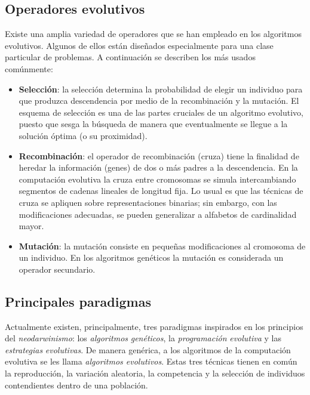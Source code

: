   \subsection{Operadores evolutivos}
  
  Existe una amplia variedad de operadores que se han empleado en los algoritmos evolutivos. Algunos de ellos est\'an 
  dise\~nados especialmente para una clase particular de problemas. A continuaci\'on se describen los m\'as usados com\'unmente:
  
  \begin{itemize}
   \item \textbf{Selecci\'on}: la selecci\'on determina la probabilidad de elegir un individuo para que produzca descendencia por medio 
   de la recombinaci\'on y la mutaci\'on. El esquema de selecci\'on es una de las partes cruciales de un algoritmo evolutivo, puesto 
   que sesga la b\'usqueda de manera que eventualmente se llegue a la soluci\'on \'optima (o su proximidad).
   \item \textbf{Recombinaci\'on}: el operador de recombinaci\'on (cruza) tiene la finalidad de heredar la informaci\'on (genes) 
   de dos o m\'as padres a la descendencia. En la computaci\'on evolutiva la cruza entre cromosomas se simula intercambiando segmentos 
   de cadenas lineales de longitud fija. Lo usual es que las t\'ecnicas de cruza se apliquen sobre representaciones binarias; sin embargo, 
   con las modificaciones adecuadas, se pueden generalizar a alfabetos de cardinalidad mayor.
   \item \textbf{Mutaci\'on}: la mutaci\'on consiste en peque\~nas modificaciones al cromosoma de un individuo. En los 
   algoritmos gen\'eticos la mutaci\'on es considerada un operador secundario.
  \end{itemize}
  
  \subsection{Principales paradigmas}
  
  Actualmente existen, principalmente, tres paradigmas inspirados en los principios del \textit{neodarwinismo}: los \textit{algoritmos}
  \textit{gen\'eticos}, la \textit{programaci\'on} \textit{evolutiva} y las \textit{estrategias} \textit{evolutivas}. De manera gen\'erica, 
  a los algoritmos de la computaci\'on evolutiva se les llama \textit{algoritmos evolutivos}. Estas tres t\'ecnicas tienen en com\'un la 
  reproducci\'on, la variaci\'on aleatoria, la competencia y la selecci\'on de individuos contendientes dentro de una poblaci\'on. 
  
